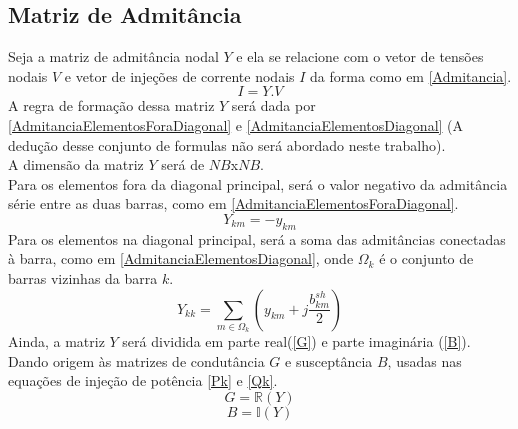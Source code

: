 \subsection{Matriz de Admitância}
Seja a matriz de admitância nodal $Y$ e ela se relacione com o vetor de tensões nodais $V$ e vetor de injeções de corrente nodais $I$ da forma como em \ref{Admitancia}.
\begin{equation}
    I = Y.V
    \label{Admitancia}
\end{equation}
A regra de formação dessa matriz $Y$ será dada por \ref{AdmitanciaElementosForaDiagonal} e \ref{AdmitanciaElementosDiagonal} (A dedução desse conjunto de formulas não será abordado neste trabalho).\\
A dimensão da matriz $Y$ será de $NB$x$NB$.\\
Para os elementos fora da diagonal principal, será o valor negativo da admitância série entre as duas barras, como em \ref{AdmitanciaElementosForaDiagonal}.
\begin{equation}
    Y_{km} = -y_{km}
    \label{AdmitanciaElementosForaDiagonal}
\end{equation}
Para os elementos na diagonal principal, será a soma das admitâncias conectadas à barra, como em \ref{AdmitanciaElementosDiagonal}, onde $\Omega_k$ é o conjunto de barras vizinhas da barra $k$.
\begin{equation}
    Y_{kk} = \sum_{m\in \Omega_k} \left(y_{km} + j\frac{b^{sh}_{km}}{2}\right)
    \label{AdmitanciaElementosDiagonal}
\end{equation}
Ainda, a matriz $Y$ será dividida em parte real(\ref{G}) e parte imaginária (\ref{B}). Dando origem às matrizes de condutância $G$ e susceptância $B$, usadas nas equações de injeção de potência \ref{Pk} e \ref{Qk}.
\begin{equation}
    G = \mathbb{R} (Y)
    \label{G}
\end{equation}
\begin{equation}
    B = \mathbb{I} (Y)
    \label{B}
\end{equation}

